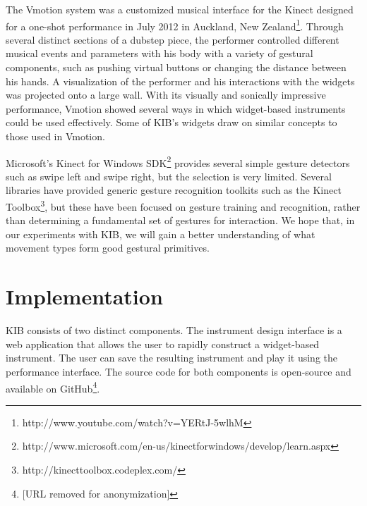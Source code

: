 \documentclass{nime-alternate}
\begin{document}
The Vmotion system was a customized musical interface for the Kinect designed for a one-shot performance in July 2012
in Auckland, New Zealand\footnote{http://www.youtube.com/watch?v=YERtJ-5wlhM}. Through 
several distinct sections of a dubstep piece, the performer controlled different musical
events and parameters with his body with a variety of gestural components, such as pushing virtual buttons
or changing the distance between his hands. A visualization of the performer and his interactions with the widgets was
projected onto a large wall. With its visually and sonically impressive performance, Vmotion showed several ways 
in which widget-based instruments could be used effectively. Some of KIB's widgets draw on similar concepts to those
used in Vmotion.

Microsoft's Kinect for Windows SDK\footnote{http://www.microsoft.com/en-us/kinectforwindows/develop/learn.aspx} provides several simple gesture detectors such as swipe left and
swipe right, but the selection is very limited. Several libraries have provided generic gesture recognition toolkits such as the Kinect Toolbox\footnote{http://kinecttoolbox.codeplex.com/}, but these have been focused on gesture training and recognition, rather
than determining a fundamental set of gestures for interaction. We hope that, in our
experiments with KIB, we will gain a better understanding of what movement types form good gestural primitives.
\section{Implementation}
KIB consists of two distinct components. The instrument design interface is a web
application that allows the user to rapidly construct a widget-based instrument. The user
can save the resulting instrument and play it using the performance interface. The source code
for both components is open-source and available on GitHub\footnote{[URL removed for anonymization]}.
\end{document}
